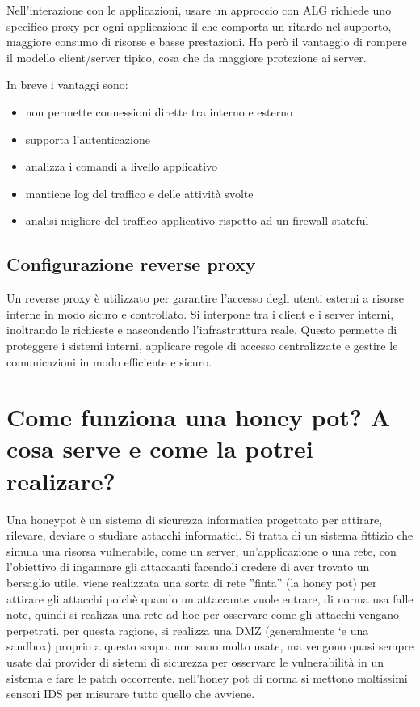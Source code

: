 \documentclass{report}
\begin{document}
\noindent Nell'interazione con le applicazioni, usare un approccio con ALG richiede uno specifico proxy per
ogni applicazione il che comporta un ritardo nel supporto, maggiore consumo di risorse e basse prestazioni.
Ha però il vantaggio di rompere il modello client/server tipico, cosa che da maggiore protezione ai
server.

\noindent In breve i vantaggi sono:
\begin{itemize}
    \item non permette connessioni dirette tra interno e esterno
    \item supporta l'autenticazione
    \item analizza i comandi a livello applicativo
    \item mantiene log del traffico e delle attività svolte
    \item analisi migliore del traffico applicativo rispetto ad un firewall stateful
\end{itemize}

\subsection{Configurazione reverse proxy}
Un reverse proxy è utilizzato per garantire l'accesso degli utenti esterni a risorse interne in modo sicuro e controllato. Si interpone tra i client e i server interni, inoltrando le richieste e nascondendo l'infrastruttura reale. 
Questo permette di proteggere i sistemi interni, applicare regole di accesso centralizzate e gestire le comunicazioni in modo efficiente e sicuro.

\section{Come funziona una honey pot? A cosa serve e come la potrei realizare?}
Una honeypot è un sistema di sicurezza informatica progettato per attirare, rilevare, deviare o studiare attacchi informatici. Si tratta di un sistema fittizio che simula 
una risorsa vulnerabile, come un server, un'applicazione o una rete, con l'obiettivo di ingannare gli attaccanti facendoli credere di aver trovato un bersaglio utile.
viene realizzata una sorta di rete ”finta” (la honey pot) per attirare gli attacchi poichè quando un attaccante
vuole entrare, di norma usa falle note, quindi si realizza una rete ad hoc per osservare come gli attacchi
vengano perpetrati. per questa ragione, si realizza una DMZ (generalmente `e una sandbox) proprio a questo
scopo.
non sono molto usate, ma vengono quasi sempre usate dai provider di sistemi di sicurezza per osservare
le vulnerabilità in un sistema e fare le patch occorrente. nell'honey pot di norma si mettono moltissimi
sensori IDS per misurare tutto quello che avviene.
\end{document}
